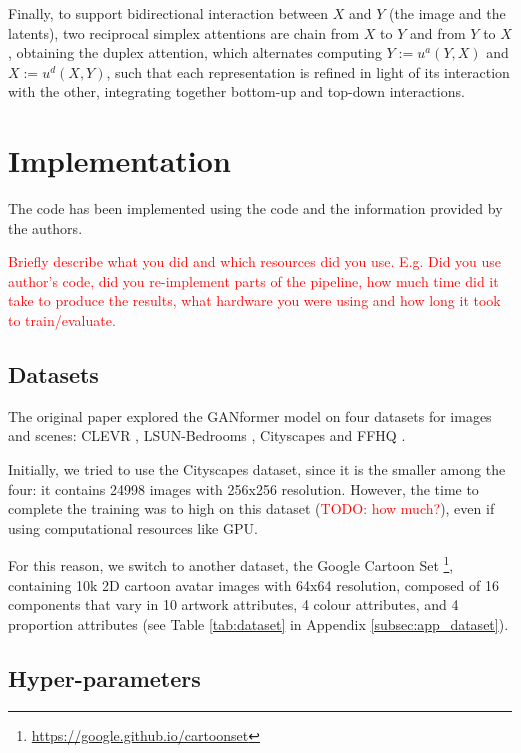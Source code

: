 \documentclass{article}
\begin{document}
	Finally, to support bidirectional interaction between $X$ and $Y$ (the image and the latents), two 
	reciprocal simplex attentions are chain from $X$ to $Y$ and from $Y$ to $X$, obtaining the duplex 
	attention, which alternates computing $Y :=u^a(Y,X)$ and $X:=u^d(X,Y)$, such that each 
	representation is refined in light of its interaction with the other, integrating together bottom-up and 
	top-down interactions.
	
	\section{Implementation}

	The code has been implemented using the code and the information provided by the authors.
	
	
	\textcolor{red}{Briefly describe what you did and which resources did you use. E.g. Did you use 
	author's code, did you re-implement parts of the pipeline, how much time did it take to produce the 
	results, what hardware you were using and how long it took to train/evaluate. }
	
	\subsection{Datasets}	\label{sec:dataset}
	The original paper \cite{hudson2021generative} explored the GANformer model on four datasets for 
	images and scenes: CLEVR \cite{johnson2017clevr}, LSUN-Bedrooms \cite{yu2015lsun}, Cityscapes 
	\cite{cordts2016cityscapes} and FFHQ \cite{karras2019style}. 
	
	Initially, we tried to use the Cityscapes dataset, since it is the smaller among the four: it contains 
	24998 images with 256x256 resolution. 
	However, the time to complete the training was to high on this dataset (\textcolor{red}{TODO: how 
	much?}), even if using computational resources like GPU.
	
	For this reason, we switch to another dataset, the Google Cartoon Set \cite{cartoonset}\footnote{	
	\url{https://google.github.io/cartoonset}}, containing 10k 2D cartoon avatar 
	images with 64x64 resolution, composed of 16 components that vary in 10 artwork attributes, 4 
	colour attributes, and 4 proportion attributes (see Table \ref{tab:dataset} in Appendix 
	\ref{subsec:app_dataset}). 

	\subsection{Hyper-parameters}\label{sec:hyperparam}%
\end{document}
